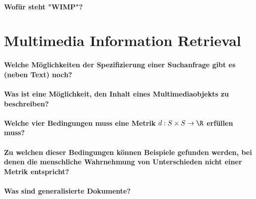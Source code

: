 \paragraph{Wofür steht "WIMP"?}

\section{Multimedia Information Retrieval}
\paragraph{Welche Möglichkeiten der Spezifizierung einer Suchanfrage gibt es (neben Text) noch?}

\paragraph{Was ist eine Möglichkeit, den Inhalt eines Multimediaobjekts zu beschreiben?}

\paragraph{Welche vier Bedingungen muss eine Metrik \( d : S \times S \to \R \) erfüllen muss?}

\paragraph{Zu welchen dieser Bedingungen können Beispiele gefunden werden, bei denen die menschliche Wahrnehmung von Unterschieden nicht einer Metrik entspricht?}

	\paragraph{Was sind generalisierte Dokumente?}

